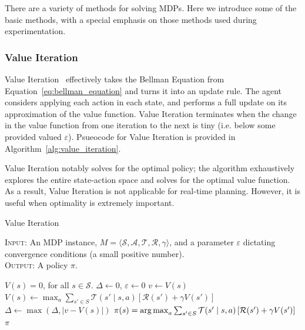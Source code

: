 \documentclass[11pt]{article}
\begin{document}
There are a variety of methods for solving MDPs. Here we introduce some of the basic methods, with a special emphasis on those methods used during experimentation.


\subsubsection{Value Iteration}

Value Iteration~\cite{bellman57} effectively takes the Bellman Equation from Equation~\ref{eq:bellman_equation} and turns it into an update rule. The agent considers applying each action in each state, and performs a full update on its approximation of the value function. Value Iteration terminates when the change in the value function from one iteration to the next is tiny (i.e. below some provided valued $\varepsilon$). Psueocode for Value Iteration is provided in Algorithm~\ref{alg:value_iteration}.

Value Iteration notably solves for the optimal policy; the algorithm exhaustively explores the entire state-action space and solves for the optimal value function. As a result, Value Iteration is not applicable for real-time planning. However, it is useful when optimality is extremely important.

\begin{algorithm}[t]
\caption{Value Iteration}\label{alg:value_iteration}
\textsc{Input:} An MDP instance, $M = \langle \mathcal{S}, \mathcal{A}, \mathcal{T}, \mathcal{R}, \gamma \rangle$, and a parameter $\varepsilon$ dictating convergence conditions (a small positive number). \\
\textsc{Output:} A policy $\pi$.
\begin{algorithmic}[1]
\State $V(s) = 0$, for all $s \in \mathcal{S}$.
\State $\Delta \gets 0$, $\varepsilon \gets 0$
\While{$\Delta > \varepsilon$}
\State $v \gets V(s)$
\State $V(s) \gets \max_a \sum_{s' \in S} \mathcal{T}(s' \mid s, a) \left[\mathcal{R}(s') + \gamma V(s') \right]$
\State $\Delta \gets \max(\Delta, |v - V(s)|)$
\EndFor
\EndWhile
{}
\State $\pi(s) = \operatorname*{arg\,max}_a \sum_{s' \in S} \mathcal{T}(s' \mid s, a) \left[\mathcal{R}(s') + \gamma V(s') \right]$
\EndFor
{} $\pi$
\end{algorithmic}
\end{algorithm}
\end{document}
